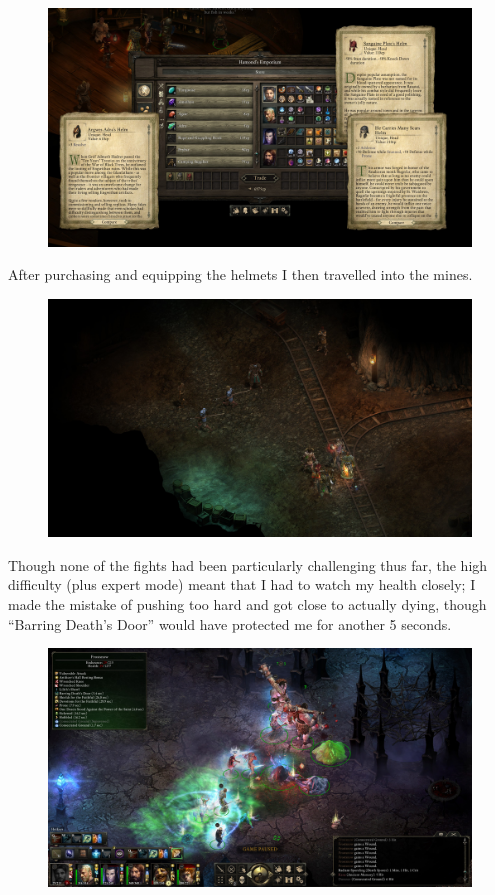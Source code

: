 \documentclass{article}
\begin{document}
\begin{figure}
\includegraphics[scale=0.33]{files/blog/2020_01_18_poe_potd_wmpt2/2020_01_18_emporium.jpg}
\end{figure}

After purchasing and equipping the helmets I then travelled into the mines.

\begin{figure}
\includegraphics[scale=0.33]{files/blog/2020_01_18_poe_potd_wmpt2/2020_01_18_mines1.jpg}
\end{figure}

Though none of the fights had been particularly challenging thus far, the high difficulty (plus expert mode) meant that I had to watch my health closely; I made the mistake of pushing too hard and got close to actually dying, though ``Barring Death's Door'' would have protected me for another 5 seconds.

\begin{figure}
\includegraphics[scale=0.33]{files/blog/2020_01_18_poe_potd_wmpt2/2020_01_18_mines2.jpg}
\end{figure}
\end{document}

